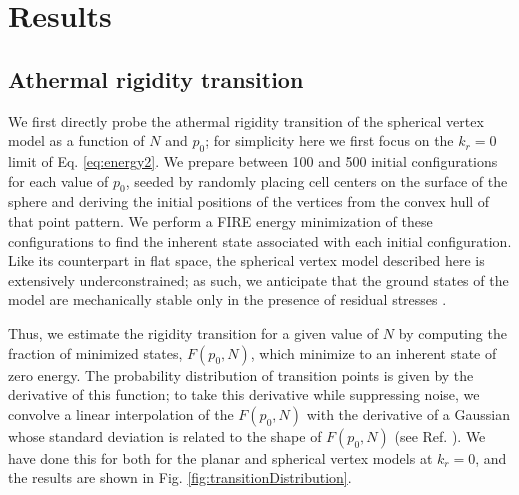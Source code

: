 \documentclass[aps,pre,reprint,superscriptaddress,nofootinbib]{revtex4-2}
\begin{document}
\section{Results}

\subsection{Athermal rigidity transition}
We first directly probe the athermal rigidity transition of the spherical vertex model as a function of $N$ and $p_0$; for simplicity here we first focus on the $k_r=0$ limit of Eq. \ref{eq:energy2}. We prepare between 100 and 500 initial configurations for each value of $p_0$, seeded by randomly placing cell centers on the surface of the sphere and deriving the initial positions of the vertices from the convex hull of that point pattern. We perform a FIRE  energy minimization \cite{bitzek2006structural} of these configurations  to find the inherent state associated with each initial configuration. Like its counterpart in flat space, the spherical vertex model described here is extensively underconstrained; as such, we anticipate that the ground states of the model are mechanically stable only in the presence of residual stresses \cite{moshe2018geometric,sussman2018no,merkel2018geometrically}. 

Thus, we estimate the rigidity transition for a given value of $N$ by computing the fraction of minimized states, $F(p_0,N)$, which minimize to an inherent state of zero energy. The probability distribution of transition points is given by the derivative of this function; to take this derivative while suppressing noise, we convolve a linear interpolation of the $F(p_0,N)$ with the derivative of a Gaussian whose standard deviation is related to the shape of $F(p_0,N)$ (see Ref. \cite{merkel2018geometrically}). We have done this for both for the planar and spherical vertex models at $k_r=0$, and the results are shown in Fig. \ref{fig:transitionDistribution}. 
\end{document}
